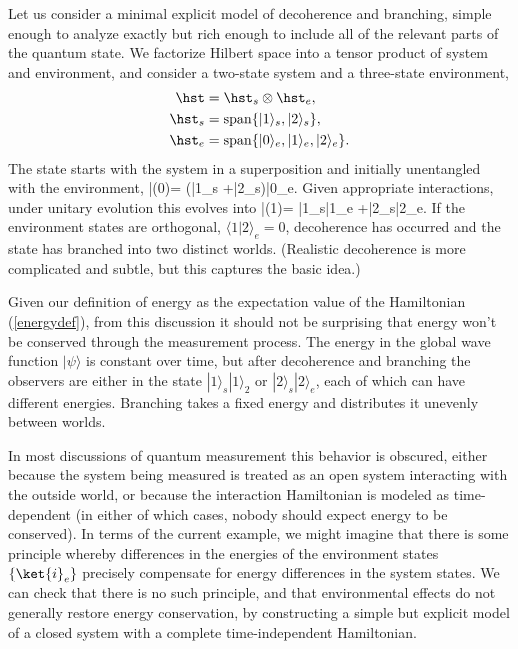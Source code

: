 \documentclass[12pt,aps,prd,onecolumn,nofootinbib,notitlepage]{revtex4-1}
\begin{document}
Let us consider a minimal explicit model of decoherence and branching, simple enough to analyze exactly but rich enough to include all of the relevant parts of the quantum state.
We factorize Hilbert space into a tensor product of system and environment, and consider a two-state system and a three-state environment, 
\begin{align}
 \hst &= \hst_s \otimes \hst_e, \nonumber\\
 \hst_s &= \mathrm{span}\{|1\rangle_s, |2\rangle_s\},\\
 \hst_e &= \mathrm{span}\{|0\rangle_e, |1\rangle_e, |2\rangle_e\}. \nonumber
\end{align}
The state starts with the system in a superposition and initially unentangled with the environment,
\be
  |\psi(0)\rangle = (\alpha|1\rangle_s +\beta |2\rangle_s)|0\rangle_e.
  \label{psi0}
\ee
Given appropriate interactions, under unitary evolution this evolves into
\be
  |\psi(1)\rangle = \alpha|1\rangle_s|1\rangle_e +\beta |2\rangle_s|2\rangle_e.
  \label{psi1}
\ee
If the environment states are orthogonal, $\langle1|2\rangle_e = 0$, decoherence has occurred and the state has branched into two distinct worlds.
(Realistic decoherence is more complicated and subtle, but this captures the basic idea.)

Given our definition of energy as the expectation value of the Hamiltonian (\ref{energydef}), from this discussion it should not be surprising that energy won't be conserved through the measurement process.
The energy in the global wave function $|\psi\rangle$ is constant over time, but after decoherence and branching the observers are either in the state $|1\rangle_s|1\rangle_2 $ or $|2\rangle_s|2\rangle_e$, each of which can have different energies.
Branching takes a fixed energy and distributes it unevenly between worlds.

In most discussions of quantum measurement this behavior is obscured, either because the system being measured is treated as an open system interacting with the outside world, or because the interaction Hamiltonian is modeled as time-dependent (in either of which cases, nobody should expect energy to be conserved).
In terms of the current example, we might imagine that there is some principle whereby differences in the energies of the environment states $\{\ket{i}_e\}$ precisely compensate for energy differences in the system states.
We can check that there is no such principle, and that environmental effects do not generally restore energy conservation, by constructing a simple but explicit model of a closed system with a complete time-independent Hamiltonian.
\end{document}
